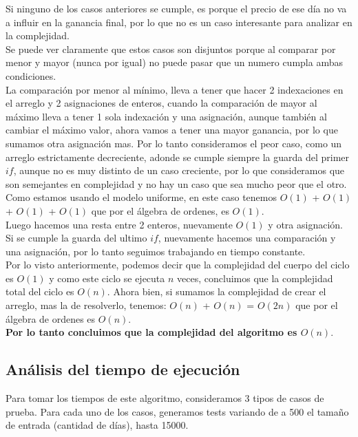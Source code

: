 \indent Si ninguno de los casos anteriores se cumple, es porque el precio de ese
día no va a influir en la ganancia final, por lo que no es un caso interesante
para analizar en la complejidad.\\
\indent Se puede ver claramente que estos casos son disjuntos porque al comparar
por menor y mayor (nunca por igual) no puede pasar que un numero cumpla ambas
condiciones.\\
\indent La comparación por menor al mínimo, lleva a tener que hacer 2
indexaciones en el arreglo y 2 asignaciones de enteros, cuando la comparación de
mayor al máximo lleva a tener 1 sola indexación y una asignación, aunque también
al cambiar el máximo valor, ahora vamos a tener una mayor ganancia, por lo que
sumamos otra asignación mas. Por lo tanto
consideramos el peor caso, como un arreglo estrictamente decreciente, adonde se
cumple siempre la guarda del primer $if$, aunque no es muy distinto de un caso
creciente, por lo que consideramos que son semejantes en complejidad y no hay un
caso que sea mucho peor que el otro. Como estamos usando el modelo
uniforme, en este caso tenemos $O(1)$ + $O(1)$ + $O(1)$ + $O(1)$ que por el
álgebra de ordenes, es $O(1)$. \\                                               
\indent Luego hacemos una resta entre 2 enteros, nuevamente $O(1)$ y otra
asignación. Si se cumple la guarda del ultimo $if$, nuevamente hacemos una
comparación y una asignación, por lo tanto seguimos trabajando en tiempo
constante.\\
\indent Por lo visto anteriormente, podemos decir que la complejidad del cuerpo
del ciclo es $O(1)$ y como este ciclo se ejecuta $n$ veces, concluimos que la
complejidad total del ciclo es $O(n)$. Ahora bien, si sumamos la complejidad de
crear el arreglo, mas la de resolverlo, tenemos: $O(n)$ + $O(n)$ = $O(2n)$ que
por el álgebra de ordenes es $O(n)$.\\
\indent \textbf{Por lo tanto concluimos que la complejidad del algoritmo es
$O(n)$}.\\

\clearpage

\subsection{Análisis del tiempo de ejecución}

\indent Para tomar los tiempos de este algoritmo, consideramos 3 tipos de casos
de prueba. Para cada uno de los casos, generamos tests variando de a 500 el
tamaño de entrada (cantidad de días), hasta 15000.

